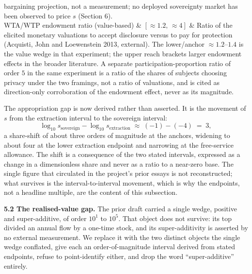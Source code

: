 \documentclass[
  11pt,
]{article}
\begin{document}
{\begin{longtable}[]
bargaining projection, not a measurement; no deployed sovereignty market
has been observed to price \(s\) (Section 6). \\
WTA/WTP endowment ratio (value-based) & \([\approx1.2,\,\approx4]\) &
Ratio of the elicited monetary valuations to accept disclosure versus to
pay for protection (Acquisti, John and Loewenstein 2013, external). The
lower/anchor \(\approx1.2\)--\(1.4\) is the value wedge in that
experiment; the upper reach brackets larger endowment effects in the
broader literature. A separate participation-proportion ratio of order
\(5\) in the same experiment is a ratio of the shares of subjects
choosing privacy under the two framings, not a ratio of valuations, and
is cited as direction-only corroboration of the endowment effect, never
as its magnitude. \\
\end{longtable}
}

The appropriation gap is now derived rather than asserted. It is the
movement of \(s\) from the extraction interval to the sovereign
interval:
\[\log_{10} s_{\text{sovereign}} - \log_{10} s_{\text{extraction}} \;\approx\; (-1) - (-4) \;=\; 3,\]
a share-shift of about three orders of magnitude at the anchors,
widening to about four at the lower extraction endpoint and narrowing at
the free-service allowance. The shift is a consequence of the two stated
intervals, expressed as a change in a dimensionless share and never as a
ratio to a near-zero base. The single figure that circulated in the
project's prior essays is not reconstructed; what survives is the
interval-to-interval movement, which is why the endpoints, not a
headline multiple, are the content of this subsection.

\textbf{5.2 The realised-value gap.} The prior draft carried a single
wedge, positive and super-additive, of order \(10^{1}\) to \(10^{5}\).
That object does not survive: its top divided an annual flow by a
one-time stock, and its super-additivity is asserted by no external
measurement. We replace it with the two distinct objects the single
wedge conflated, give each an order-of-magnitude interval derived from
stated endpoints, refuse to point-identify either, and drop the word
``super-additive'' entirely.
\end{document}

